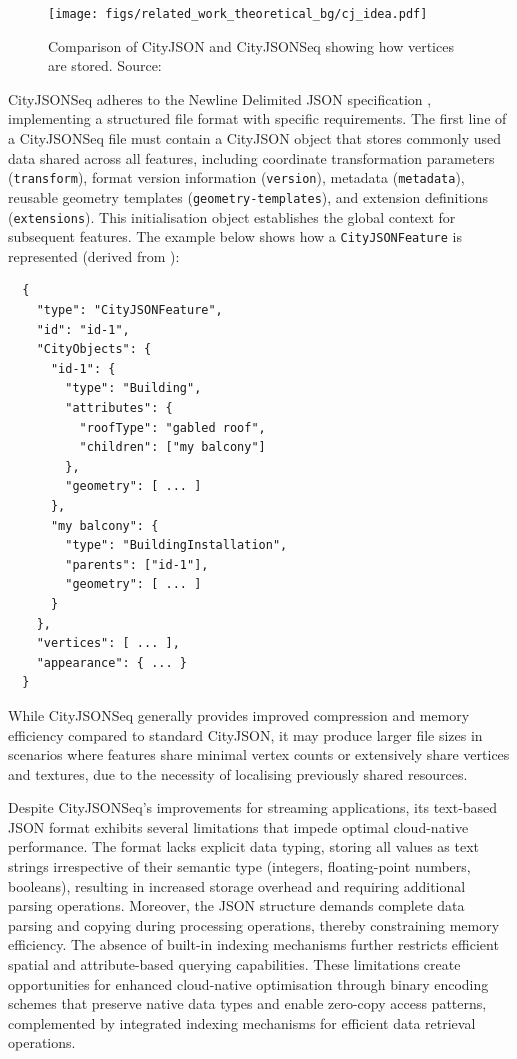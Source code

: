 \begin{figure}[htbp]
  \centering
  \texttt{[image: figs/related\_work\_theoretical\_bg/cj\_idea.pdf]}
  \caption[CityJSONSeq Local Vertices]{Comparison of CityJSON and CityJSONSeq showing how vertices are stored. Source: \citep{ledoux_2024}}
  \label{fig:cityjsonseq_idea}
\end{figure}

CityJSONSeq adheres to the Newline Delimited JSON specification \citep{jsonnd}, implementing a structured file format with specific requirements. The first line of a CityJSONSeq file must contain a CityJSON object that stores commonly used data shared across all features, including coordinate transformation parameters (\texttt{transform}), format version information (\texttt{version}), metadata (\texttt{metadata}), reusable geometry templates (\texttt{geometry-templates}), and extension definitions (\texttt{extensions}). This initialisation object establishes the global context for subsequent features.
The example below shows how a \texttt{CityJSONFeature} is represented (derived from \citet{ledoux_2024}):

\begin{lstlisting}
  {
    "type": "CityJSONFeature",
    "id": "id-1",
    "CityObjects": {
      "id-1": {
        "type": "Building",
        "attributes": {
          "roofType": "gabled roof",
          "children": ["my balcony"]
        },
        "geometry": [ ... ]
      },
      "my balcony": {
        "type": "BuildingInstallation",
        "parents": ["id-1"],
        "geometry": [ ... ]
      }
    },
    "vertices": [ ... ],
    "appearance": { ... }
  }
\end{lstlisting}
While CityJSONSeq generally provides improved compression and memory efficiency compared to standard CityJSON, it may produce larger file sizes in scenarios where features share minimal vertex counts or extensively share vertices and textures, due to the necessity of localising previously shared resources.

Despite CityJSONSeq's improvements for streaming applications, its text-based JSON format exhibits several limitations that impede optimal cloud-native performance. The format lacks explicit data typing, storing all values as text strings irrespective of their semantic type (integers, floating-point numbers, booleans), resulting in increased storage overhead and requiring additional parsing operations. Moreover, the JSON structure demands complete data parsing and copying during processing operations, thereby constraining memory efficiency. The absence of built-in indexing mechanisms further restricts efficient spatial and attribute-based querying capabilities. These limitations create opportunities for enhanced cloud-native optimisation through binary encoding schemes that preserve native data types and enable zero-copy access patterns, complemented by integrated indexing mechanisms for efficient data retrieval operations.

